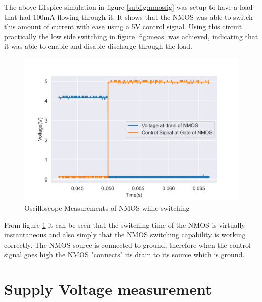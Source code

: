  The above LTspice simulation in figure \ref{subfig:nmosfig} was setup to have a load that had 100mA flowing through it. It shows that the NMOS was able to switch this amount of current with ease using a 5V control signal. Using this circuit practically the low side switching in figure \ref{fig:meas} was achieved, indicating that it was able to enable and disable discharge through the load.


\begin{figure}[!htb]
\centering
\includegraphics[scale=0.6]{./Figures/NMOSmeas}
\caption{Oscilloscope Measurements of NMOS while switching}
\label{fig:measNMOS}
\end{figure}

From figure \ref{fig:measNMOS} it can be seen that the switching time of the NMOS is virtually instantaneous and also simply that the NMOS switching capability is working correctly. The NMOS source is connected to ground, therefore when the control signal goes high the NMOS "connects" its drain to its source which is ground.

\newpage
\section{Supply Voltage measurement}

